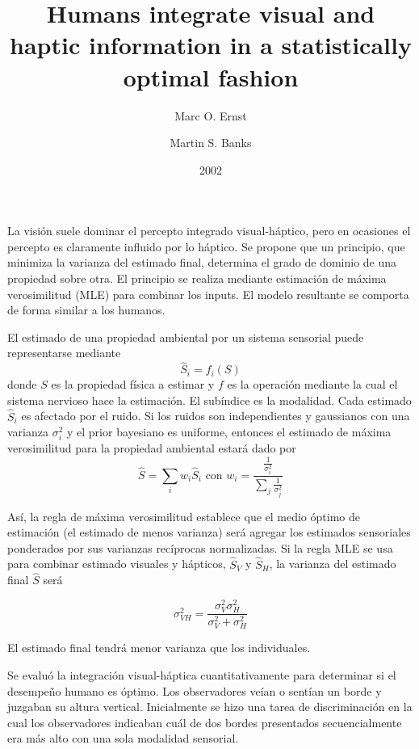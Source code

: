 \documentclass[a4paper,12pt]{article}
\title{Humans integrate visual and haptic information in a statistically optimal fashion}
\author{Marc O. Ernst \and Martin S. Banks}
\date{2002}
\begin{document}
{\scshape\bfseries \maketitle}

La visión suele dominar el percepto integrado visual-háptico, pero en ocasiones el percepto es claramente influido por lo háptico. Se propone que un principio, que minimiza la varianza del estimado final, determina el grado de dominio de una propiedad sobre otra. El principio se realiza mediante estimación de máxima verosimilitud (MLE) para combinar los inputs. El modelo resultante se comporta de forma similar a los humanos.

El estimado de una propiedad ambiental por un sistema sensorial puede representarse mediante
\begin{equation}
	\hat S_{i} = f_{i}(S)
\end{equation}
donde $S$ es la propiedad física a estimar y $f$ es la operación mediante la cual el sistema nervioso hace la estimación. El subíndice es la modalidad. Cada estimado $\hat S_{i}$ es afectado por el ruido. Si los ruidos son independientes y gaussianos con una varianza $\sigma_{i}^{2}$ y el prior bayesiano es uniforme, entonces el estimado de máxima verosimilitud para la propiedad ambiental estará dado por
\begin{equation}
	\hat S =
	\sum_{i}w_{i}\hat S_{i}
	\mbox{\ \ con\ \ }
	w_{i} =
	\frac{
		\frac{1}{\sigma_{i}^{2}}
	}{
		\sum_{j}\frac{1}{\sigma_{j}^{2}}
	}
\end{equation}

Así, la regla de máxima verosimilitud establece que el medio óptimo de estimación (el estimado de menos varianza) será agregar los estimados sensoriales ponderados por sus varianzas recíprocas normalizadas. Si la regla MLE se usa para combinar estimado visuales y hápticos, $\hat S_{V}$ y $\hat S_{H}$, la varianza del estimado final $\hat S$ será

\begin{equation}
	\sigma_{VH}^{2} =
	\frac{
		\sigma_{V}^{2}\sigma_{H}^{2}
	}{
		\sigma_{V}^{2} + \sigma_{H}^{2}
	}
\end{equation}

El estimado final tendrá menor varianza que los individuales.

Se evaluó la integración visual-háptica cuantitativamente para determinar si el desempeño humano es óptimo. Los observadores veían o sentían un borde y juzgaban su altura vertical. Inicialmente se hizo una tarea de discriminación en la cual los observadores indicaban cuál de dos bordes presentados secuencialmente era más alto con una sola modalidad sensorial.
\end{document}
